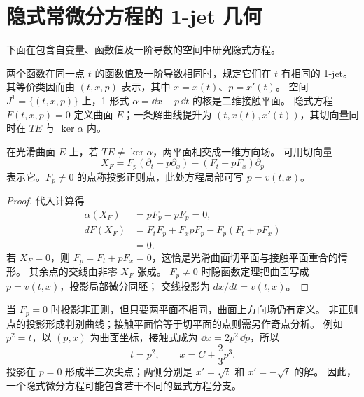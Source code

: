 \section{隐式常微分方程的 1-jet 几何}
下面在包含自变量、函数值及一阶导数的空间中研究隐式方程。
\begin{definition}
两个函数在同一点 $t$ 的函数值及一阶导数相同时，规定它们在 $t$ 有相同的 1-jet。
其等价类因而由 $(t,x,p)$ 表示，其中 $x=x(t)$、$p=x'(t)$。
空间 $J^1=\{(t,x,p)\}$ 上，1-形式 $\alpha=\dd x-p\,\dd t$ 的核是二维接触平面。
隐式方程 $F(t,x,p)=0$ 定义曲面 $E$；一条解曲线提升为
$(t,x(t),x'(t))$，其切向量同时在 $TE$ 与 $\ker\alpha$ 内。
\end{definition}
\begin{proposition}
在光滑曲面 $E$ 上，若 $TE\ne\ker\alpha$，两平面相交成一维方向场。
可用切向量
\[
 X_F=F_p(\partial_t+p\partial_x)-(F_t+pF_x)\partial_p
\]
表示它。$F_p\ne0$ 的点称投影正则点，此处方程局部可写 $p=v(t,x)$。
\end{proposition}
\begin{proof}
代入计算得
\begin{align*}
 \alpha(X_F)&=pF_p-pF_p=0,\\
 dF(X_F)&=F_tF_p+F_xpF_p-F_p(F_t+pF_x)\\
 &=0.
\end{align*}
若 $X_F=0$，则 $F_p=F_t+pF_x=0$，这恰是光滑曲面切平面与接触平面重合的情形。
其余点的交线由非零 $X_F$ 张成。
$F_p\ne0$ 时隐函数定理把曲面写成 $p=v(t,x)$，投影局部微分同胚；
交线投影为 $dx/dt=v(t,x)$。
\end{proof}
当 $F_p=0$ 时投影非正则，但只要两平面不相同，曲面上方向场仍有定义。
非正则点的投影形成判别曲线；接触平面恰等于切平面的点则需另作奇点分析。
例如 $p^2=t$，以 $(p,x)$ 为曲面坐标，接触式成为
$\dd x=2p^2\,\dd p$，所以
\[
 t=p^2,\qquad x=C+\frac23p^3.
\]
投影在 $p=0$ 形成半三次尖点；两侧分别是 $x'=\sqrt t$ 和 $x'=-\sqrt t$ 的解。
因此，一个隐式微分方程可能包含若干不同的显式方程分支。


